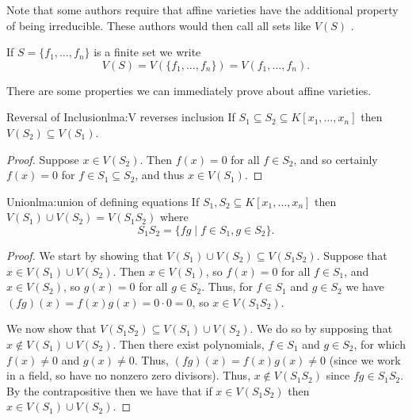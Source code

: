 \documentclass[fleqn]{NotesClass}
\begin{document}
    \begin{wrn}
        Note that some authors require that affine varieties have the additional property of being irreducible.
        These authors would then call all sets like \(V(S)\) .
    \end{wrn}
    
    \begin{ntn}{}{}
        If \(S = \{f_1, \dotsc, f_n\}\) is a finite set we write
        \begin{equation}
            V(S) = V(\{f_1, \dotsc, f_n\}) = V(f_1, \dotsc, f_n).
        \end{equation}
    \end{ntn}
    
    There are some properties we can immediately prove about affine varieties.
    
    \begin{lma}{Reversal of Inclusion}{lma:V reverses inclusion}
        If \(S_1 \subseteq S_2 \subseteq K[x_1, \dotsc, x_n]\) then \(V(S_2) \subseteq V(S_1)\).
        \begin{proof}
            Suppose \(x \in V(S_2)\).
            Then \(f(x) = 0\) for all \(f \in S_2\), and so certainly \(f(x) = 0\) for \(f \in S_1 \subseteq S_2\), and thus \(x \in V(S_1)\).
        \end{proof}
    \end{lma}
    
    \begin{lma}{Union}{lma:union of defining equations}
        If \(S_1, S_2 \subseteq K[x_1, \dotsc, x_n]\) then \(V(S_1) \cup V(S_2) = V(S_1 S_2)\) where
        \begin{equation}
            S_1 S_2 = \{fg \mid f \in S_1, g \in S_2\}.
        \end{equation}
        \begin{proof}
            We start by showing that \(V(S_1) \cup V(S_2) \subseteq V(S_1 S_2)\).
            Suppose that \(x \in V(S_1) \cup V(S_2)\).
            Then \(x \in V(S_1)\), so \(f(x) = 0\) for all \(f \in S_1\), and \(x \in V(S_2)\), so \(g(x) = 0\) for all \(g \in S_2\).
            Thus, for \(f \in S_1\) and \(g \in S_2\) we have \((fg)(x) = f(x)g(x) = 0 \cdot 0 = 0\), so \(x \in V(S_1S_2)\).
            
            We now show that \(V(S_1S_2) \subseteq V(S_1) \cup V(S_2)\).
            We do so by supposing that \(x \notin V(S_1) \cup V(S_2)\).
            Then there exist polynomials, \(f \in S_1\) and \(g \in S_2\), for which \(f(x) \ne 0\) and \(g(x) \ne 0\).
            Thus, \((fg)(x) = f(x)g(x) \ne 0\) (since we work in a field, so have no nonzero zero divisors).
            Thus, \(x \notin V(S_1S_2)\) since \(fg \in S_1S_2\).
            By the contrapositive then we have that if \(x \in V(S_1S_2)\) then \(x \in V(S_1) \cup V(S_2)\).
        \end{proof}
    \end{lma}
    
\end{document}
